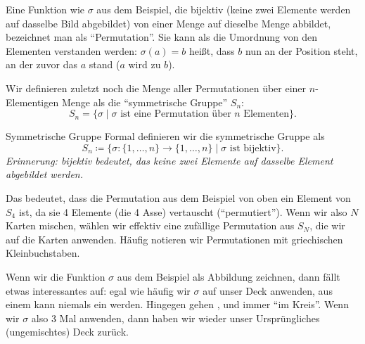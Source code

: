 \documentclass[../../main.tex]{subfiles}
\begin{document}
Eine Funktion wie $\sigma$ aus dem Beispiel, die bijektiv (keine zwei Elemente werden auf dasselbe Bild abgebildet) von einer Menge auf dieselbe Menge abbildet, bezeichnet man als \enquote{Permutation}. Sie kann als die Umordnung von den Elementen verstanden werden: $\sigma(a) = b$ heißt, dass $b$ nun an der Position steht, an der zuvor das $a$ stand ($a$ wird zu $b$).

Wir definieren zuletzt noch die Menge aller Permutationen über einer $n$-Elementigen Menge als die \enquote{symmetrische Gruppe} $S_n$:
$$S_n = \{\sigma \mid \sigma\text{ ist eine Permutation über $n$ Elementen}\}.$$
\begin{advanced}{Symmetrische Gruppe}
    Formal definieren wir die symmetrische Gruppe als
    $$S_n \coloneqq \{\sigma\colon \{1,\dots, n\}\to\{1,\dots, n\} \mid \sigma\text{ ist bijektiv}\}.$$
    \textit{Erinnerung: bijektiv bedeutet, das keine zwei Elemente auf dasselbe Element abgebildet werden.}
\end{advanced}
Das bedeutet, dass die Permutation aus dem Beispiel von oben ein Element von $S_4$ ist, da sie 4 Elemente (die 4 Asse) vertauscht (\enquote{permutiert}). Wenn wir also $N$ Karten mischen, wählen wir effektiv eine zufällige Permutation aus $S_N$, die wir auf die Karten anwenden.
Häufig notieren wir Permutationen mit griechischen Kleinbuchstaben.


Wenn wir die Funktion $\sigma$ aus dem Beispiel als Abbildung zeichnen, dann fällt etwas interessantes auf: egal wie häufig wir $\sigma$ auf unser Deck anwenden, aus einem \AceDiamond{} kann niemals ein \AceClub{} werden. Hingegen gehen \AceDiamond{}, \AceHeart{} und \AceSpade{} immer \enquote{im Kreis}. Wenn wir $\sigma$ also 3 Mal anwenden, dann haben wir wieder unser Ursprüngliches (ungemischtes) Deck zurück.
\end{document}
